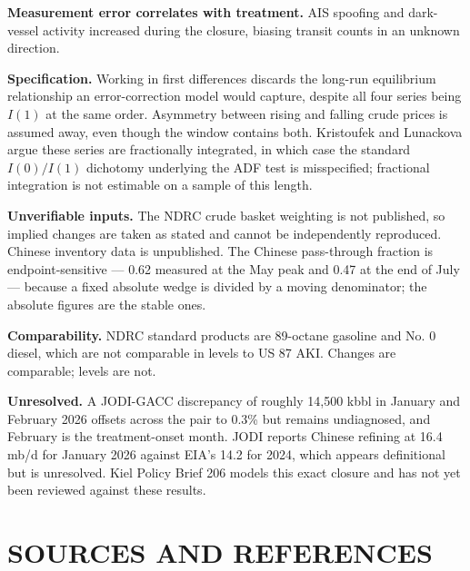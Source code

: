 \documentclass[11pt]{article}
\begin{document}
\textbf{Measurement error correlates with treatment.} AIS spoofing and
dark-vessel activity increased during the closure, biasing transit
counts in an unknown direction.

\textbf{Specification.} Working in first differences discards the
long-run equilibrium relationship an error-correction model would
capture, despite all four series being $I(1)$ at the same order.
Asymmetry between rising and falling crude prices is assumed away, even
though the window contains both. Kristoufek and Lunackova argue these
series are fractionally integrated, in which case the standard
$I(0)/I(1)$ dichotomy underlying the ADF test is misspecified;
fractional integration is not estimable on a sample of this length.

\textbf{Unverifiable inputs.} The NDRC crude basket weighting is not
published, so implied changes are taken as stated and cannot be
independently reproduced. Chinese inventory data is unpublished. The
Chinese pass-through fraction is endpoint-sensitive --- 0.62 measured at
the May peak and 0.47 at the end of July --- because a fixed absolute
wedge is divided by a moving denominator; the absolute figures are the
stable ones.

\textbf{Comparability.} NDRC standard products are 89-octane gasoline
and No. 0 diesel, which are not comparable in levels to US 87 AKI.
Changes are comparable; levels are not.

\textbf{Unresolved.} A JODI-GACC discrepancy of roughly 14,500 kbbl in
January and February 2026 offsets across the pair to 0.3\% but remains
undiagnosed, and February is the treatment-onset month. JODI reports
Chinese refining at 16.4 mb/d for January 2026 against EIA's 14.2 for
2024, which appears definitional but is unresolved. Kiel Policy Brief
206 models this exact closure and has not yet been reviewed against
these results.


\newpage
\section*{SOURCES AND REFERENCES}
\small
\setlength{\parskip}{0.3em}
\end{document}
